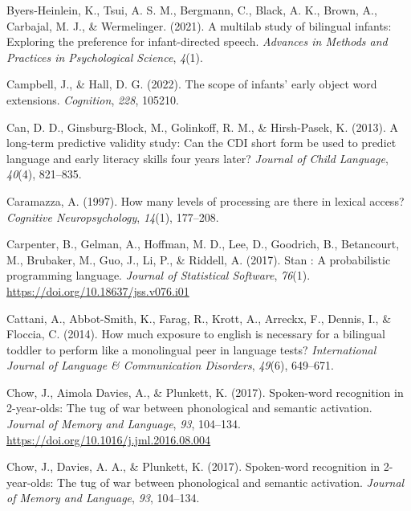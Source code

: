 \documentclass[
  12pt,
  b5paperpaper,
  twoside]{scrreprt}
\newlength{\cslhangindent}
\newlength{\cslentryspacingunit} %
\newenvironment{CSLReferences}[2] %
 {%
  \setlength{\parindent}{0pt}
  \ifodd #1
  \let\oldpar\par
  \def\par{\hangindent=\cslhangindent\oldpar}
  \fi
  \setlength{\parskip}{#2\cslentryspacingunit}
 }%
 {}
\begin{document}
\begin{CSLReferences}{1}{0}
\leavevmode{}%
Byers-Heinlein, K., Tsui, A. S. M., Bergmann, C., Black, A. K., Brown,
A., Carbajal, M. J., \& Wermelinger. (2021). A multilab study of
bilingual infants: Exploring the preference for infant-directed speech.
\emph{Advances in Methods and Practices in Psychological Science},
\emph{4}(1).

\leavevmode{}%
Campbell, J., \& Hall, D. G. (2022). The scope of infants' early object
word extensions. \emph{Cognition}, \emph{228}, 105210.

\leavevmode{}%
Can, D. D., Ginsburg-Block, M., Golinkoff, R. M., \& Hirsh-Pasek, K.
(2013). A long-term predictive validity study: Can the CDI short form be
used to predict language and early literacy skills four years later?
\emph{Journal of Child Language}, \emph{40}(4), 821--835.

\leavevmode{}%
Caramazza, A. (1997). How many levels of processing are there in lexical
access? \emph{Cognitive Neuropsychology}, \emph{14}(1), 177--208.

\leavevmode{}%
Carpenter, B., Gelman, A., Hoffman, M. D., Lee, D., Goodrich, B.,
Betancourt, M., Brubaker, M., Guo, J., Li, P., \& Riddell, A. (2017).
Stan : A probabilistic programming language. \emph{Journal of
Statistical Software}, \emph{76}(1).
\url{https://doi.org/10.18637/jss.v076.i01}

\leavevmode{}%
Cattani, A., Abbot-Smith, K., Farag, R., Krott, A., Arreckx, F., Dennis,
I., \& Floccia, C. (2014). How much exposure to english is necessary for
a bilingual toddler to perform like a monolingual peer in language
tests? \emph{International Journal of Language \& Communication
Disorders}, \emph{49}(6), 649--671.

\leavevmode{}%
Chow, J., Aimola Davies, A., \& Plunkett, K. (2017). Spoken-word
recognition in 2-year-olds: The tug of war between phonological and
semantic activation. \emph{Journal of Memory and Language}, \emph{93},
104--134. \url{https://doi.org/10.1016/j.jml.2016.08.004}

\leavevmode{}%
Chow, J., Davies, A. A., \& Plunkett, K. (2017). Spoken-word recognition
in 2-year-olds: The tug of war between phonological and semantic
activation. \emph{Journal of Memory and Language}, \emph{93}, 104--134.


\end{CSLReferences}
\end{document}
